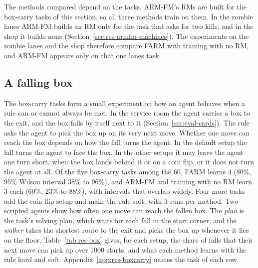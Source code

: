 \documentclass[11pt,english,listoffigures,listoftables]{tfgetsinf}
\begin{document}
The methods compared depend on the tasks. ARM-FM's RMs are built for the box-carry tasks of this section, so all three methods train on them. In the zombie lanes ARM-FM builds an RM only for the task that asks for two kills, and in the shop it builds none (Section~\ref{sec:res-armfm-machines}). The experiments on the zombie lanes and the shop therefore compare FARM with training with no RM, and ARM-FM appears only on that one lanes task.

\subsection{A falling box}
\label{sec:res-box}

The box-carry tasks form a small experiment on how an agent behaves when a rule can or cannot always be met. In the service room the agent carries a box to the exit, and the box falls by itself next to it (Section~\ref{sec:eval-cards}). The rule asks the agent to pick the box up on its very next move. Whether one move can reach the box depends on how the fall turns the agent. In the default setup the fall turns the agent to face the box. In the other setups it may leave the agent one turn short, when the box lands behind it or on a coin flip, or it does not turn the agent at all. Of the five box-carry tasks among the 60, FARM learns 4 (80\%, 95\% Wilson interval 38\% to 96\%), and ARM-FM and training with no RM learn 3 each (60\%, 23\% to 88\%), with intervals that overlap widely. Four more tasks add the coin-flip setup and make the rule soft, with 3 runs per method. Two scripted agents show how often one move can reach the fallen box. The \textit{plan} is the task's solving plan, which waits for each fall in the start corner, and the \textit{walker} takes the shortest route to the exit and picks the box up whenever it lies on the floor. Table~\ref{tab:res-box} gives, for each setup, the share of falls that their next move can pick up over 1000 starts, and what each method learns with the rule hard and soft. Appendix~\ref{app:res-boxcarry} names the task of each row.
\end{document}
